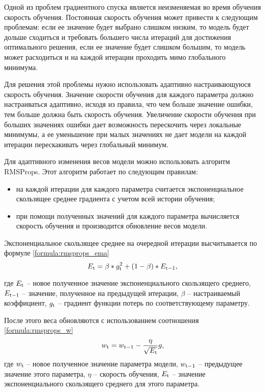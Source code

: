 Одной из проблем градиентного спуска является неизменяемая во время обучения скорость обучения. 
Постоянная скорость обучения может привести к следующим проблемам: если ее значение будет выбрано слишком низким, то модель будет дольше сходиться и требовать большего числа итераций для достижения оптимального решения, если ее значение будет слишком большим, то модель может расходиться и на каждой итерации проходить мимо глобального минимума.

Для решения этой проблемы нужно использовать адаптивно настраивающуюся скорость обучения.
Значение скорости обучения для каждого параметра должно настраиваться адаптивно, исходя из правила, что чем больше значение ошибки, тем больше должна быть скорость обучения. 
Увеличение скорости обучения при больших значениях ошибки дает возможность перескочить через локальные минимумы, а ее уменьшение при малых значениях не дает модели на каждой итерации перескакивать через глобальный минимум.

Для адаптивного изменения весов модели можно использовать алгоритм RMSProps. Этот алгоритм работает по следующим правилам:
\begin{itemize}
	\item на каждой итерации для каждого параметра считается экспоненциальное скользящее среднее градиента с учетом всей истории обучения;
	\item при помощи полученных значений для каждого параметра вычисляется скорость обучения и производится обновление весов модели.
\end{itemize}

Экспоненциальное скользящее среднее на очередной итерации высчитывается по формуле \ref{formula:rmsprops_ema}
\begin{equation}\label{formula:rmsprops_ema}
	E_{\rm{t}} = \beta * g_{\rm{t}}^2 + (1 - \beta) * E_{\rm{t-1}},
\end{equation}

где $E_{\rm{t}}$ -- новое полученное значение экспоненциального скользящего среднего, $E_{\rm{t-1}}$ -- значение, полученное на предыдущей итерации, $\beta$ -- настраиваемый коэффициент, $g_{\rm{t}}$ -- градиент функции потерь по соответствующему параметру.

После этого веса обновляются с использованием соотношения \ref{formula:rmsprops_w}
\begin{equation}\label{formula:rmsprops_w}
	w_{\rm{t}} = w_{\rm{t-1}} - \frac{\eta}{\sqrt{E_{\rm{t}}}}g,
\end{equation}
где $w_{\rm{t}}$ -- новое полученное значение параметра модели, $w_{\rm{t-1}}$ -- предыдущее значение этого параметра, $\eta$ -- скорость обучения, $E_{\rm{t}}$ -- значение экспоненциального скользящего среднего для этого параметра.


